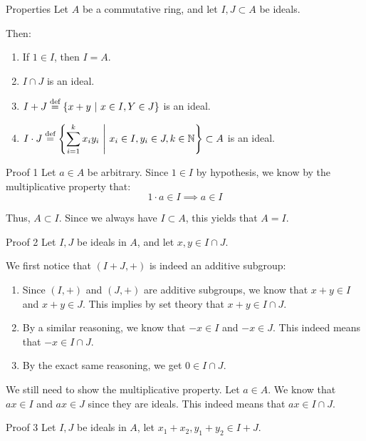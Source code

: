 \documentclass[a4paper]{article}
\begin{document}
\begin{parag}{Properties}
    Let $A$ be a commutative ring, and let $I, J \subset A$ be ideals.

    Then:
    \begin{enumerate}
        \item If $1 \in I$, then $I = A$.
        \item $I \cap J$ is an ideal.
        \item $I + J \over{=}{def} \left\{x + y \suchthat x \in I, Y \in J\right\}$ is an ideal.
        \item $\displaystyle  I\cdot J \over{=}{def} \left\{\sum_{i=1}^{k} x_i y_i \suchthat x_i \in I, y_i \in J, k \in \mathbb{N}\right\} \subset A$ is an ideal.
    \end{enumerate}
    
    \begin{subparag}{Proof 1}
        Let $a \in A$ be arbitrary. Since $1 \in I$ by hypothesis, we know by the multiplicative property that: 
        \[1\cdot a \in I \implies a \in I\]
        
        Thus, $A \subset I$. Since we always have $I \subset A$, this yields that $A = I$.
    \end{subparag}

    \begin{subparag}{Proof 2}
        Let $I, J$ be ideals in $A$, and let $x, y \in I \cap J$.

        We first notice that $\left(I + J, +\right)$ is indeed an additive subgroup:
        \begin{enumerate}
            \item Since $\left(I, +\right)$ and $\left(J, +\right)$ are additive subgroups, we know that $x+y \in I$ and $x + y \in J$. This implies by set theory that $x + y \in  I \cap J$.
            \item By a similar reasoning, we know that $-x \in I$ and $-x \in J$. This indeed means that $-x \in I \cap J$.
            \item By the exact same reasoning, we get $0 \in I \cap J$. 
        \end{enumerate}
        
        We still need to show the multiplicative property. Let $a \in A$. We know that $ax \in I$ and $ax \in J$ since they are ideals. This indeed means that $ax \in I \cap J$.
    \end{subparag}

    \begin{subparag}{Proof 3}
        Let $I, J$ be ideals in $A$, let $x_1 + x_2, y_1 + y_2 \in I + J$. 


\end{subparag}
\end{parag}
\end{document}
